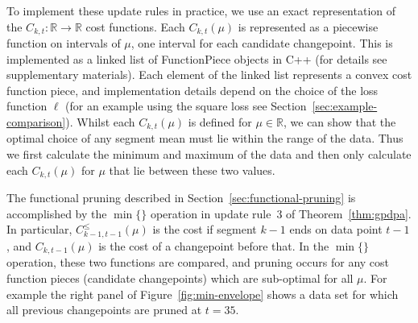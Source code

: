 \documentclass[twoside,11pt]{article}
\newcommand{\RR}{\mathbb R}
\begin{document}
To implement these update rules in practice, we use an exact
representation of the $C_{k,t}:\RR\rightarrow\RR$ cost functions. Each
$C_{k,t}(\mu)$ is represented as a piecewise function on intervals of
$\mu$, one interval for each candidate changepoint. This is
implemented as a linked list of FunctionPiece objects in C++ (for
details see supplementary materials). Each element of the linked list
represents a convex cost function piece, and implementation details
depend on the choice of the loss function $\ell$ (for an example using
the square loss see Section~\ref{sec:example-comparison}). Whilst each
$C_{k,t}(\mu)$ is defined for $\mu \in \RR$, we can show
that the optimal choice of any segment mean must lie within the range
of the data. Thus we first calculate the minimum and maximum of the
data and then only calculate each $C_{k,t}(\mu)$ for $\mu$ that lie
between these two values. 

\begin{remark}
  The functional pruning described in
  Section~\ref{sec:functional-pruning} is accomplished by the
  $\min\{\}$ operation in update rule~3 of Theorem~\ref{thm:gpdpa}. In
  particular, $C_{k-1,t-1}^\leq(\mu)$ is the cost if segment $k-1$
  ends on data point $t-1$, and $C_{k,t-1}(\mu)$ is the cost of a
  changepoint before that. In the $\min\{\}$ operation, these two
  functions are compared, and pruning occurs for any cost function
  pieces (candidate changepoints) which are sub-optimal for all $\mu$.
  For example the right panel of Figure~\ref{fig:min-envelope} shows a
  data set for which all previous changepoints are pruned at $t=35$.
\end{remark}
\end{document}
